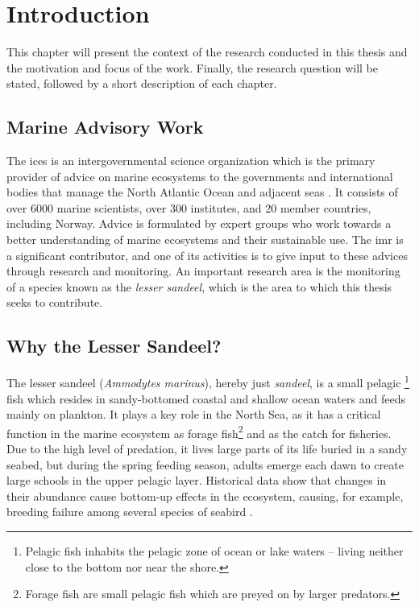 \chapter{Introduction}
    This chapter will present the context of the research conducted in this thesis and the motivation and focus of the work. Finally, the research question will be stated, followed by a short description of each chapter. 
    
    
    

\section{Marine Advisory Work}
    The \gls{ices} is an intergovernmental science organization which is the primary provider of advice on marine ecosystems to the governments and international bodies that manage the North Atlantic Ocean and adjacent seas \cite{ICES2020}. It consists of over 6000 marine scientists, over 300 institutes, and 20 member countries, including Norway. Advice is formulated by expert groups who work towards a better understanding of marine ecosystems and their sustainable use. The \gls{imr} is a significant  contributor, and one of its activities is to give input to these advices through research and monitoring. An important research area is the monitoring of a species known as the \textit{lesser sandeel}, which is the area to which this thesis seeks to contribute.
    
\section{Why the Lesser Sandeel?}
    The lesser sandeel (\textit{Ammodytes marinus}), hereby just \textit{sandeel}, is
    a small pelagic \footnote{Pelagic fish inhabits the pelagic zone of ocean or lake waters – living neither close to the bottom nor near the shore.} fish which resides in sandy-bottomed coastal and shallow ocean waters and feeds mainly on plankton. It plays a key role in the North Sea, as it has a critical function in the marine ecosystem as forage fish\footnote{Forage fish are small pelagic fish which are preyed on by larger predators.} and as the catch for fisheries. Due to the high level of predation, it lives large parts of its life buried in a sandy seabed, but during the spring feeding season, adults emerge each dawn to create large schools in the upper pelagic layer. Historical data show that changes in their abundance cause bottom-up effects in the ecosystem, causing, for example, breeding failure among several species of seabird \cite{johnsen2017collective}. 
    
